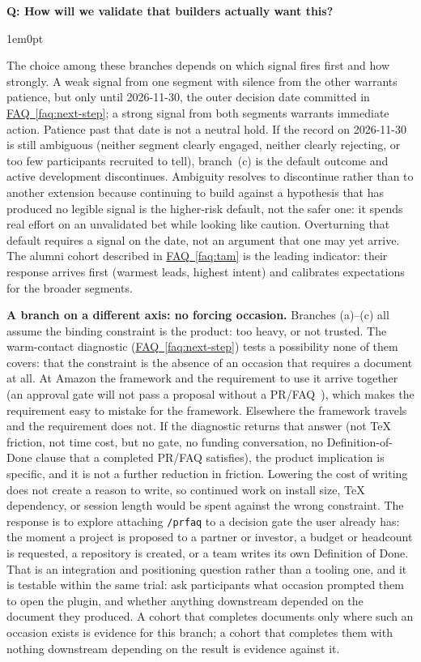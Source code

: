 \documentclass[11pt,letterpaper]{article}
\newcounter{faqnum}
\newenvironment{faqpair}[1]{%
  \needspace{4\baselineskip}%
  \vspace{0.5em}%
  \refstepcounter{faqnum}%
  \noindent\textbf{\color{SectionBlue}Q\thefaqnum: #1}\par\nopagebreak[4]%
  \vspace{0.2em}%
  \begin{adjustwidth}{1em}{0pt}%
  \setlength{\parindent}{0pt}%
}{%
  \end{adjustwidth}%
  \vspace{0.5em}%
}
\newcommand{\faqref}[1]{\hyperref[#1]{FAQ~\ref*{#1}}}
\begin{document}
\begin{faqpair}{How will we validate that builders actually want this?}
  \noindent The choice among these branches depends on which signal fires first and how strongly. A weak signal from one segment with silence from the other warrants patience, but only until 2026-11-30, the outer decision date committed in \faqref{faq:next-step}; a strong signal from both segments warrants immediate action. Patience past that date is not a neutral hold. If the record on 2026-11-30 is still ambiguous (neither segment clearly engaged, neither clearly rejecting, or too few participants recruited to tell), branch~(c) is the default outcome and active development discontinues. Ambiguity resolves to discontinue rather than to another extension because continuing to build against a hypothesis that has produced no legible signal is the higher-risk default, not the safer one: it spends real effort on an unvalidated bet while looking like caution. Overturning that default requires a signal on the date, not an argument that one may yet arrive. The alumni cohort described in \faqref{faq:tam} is the leading indicator: their response arrives first (warmest leads, highest intent) and calibrates expectations for the broader segments.

  \textbf{A branch on a different axis: no forcing occasion.} Branches (a)--(c) all assume the binding constraint is the product: too heavy, or not trusted. The warm-contact diagnostic (\faqref{faq:next-step}) tests a possibility none of them covers: that the constraint is the absence of an occasion that requires a document at all. At Amazon the framework and the requirement to use it arrive together (an approval gate will not pass a proposal without a PR/FAQ~\cite{bryar2021workingbackwards}), which makes the requirement easy to mistake for the framework. Elsewhere the framework travels and the requirement does not. If the diagnostic returns that answer (not TeX friction, not time cost, but no gate, no funding conversation, no Definition-of-Done clause that a completed PR/FAQ satisfies), the product implication is specific, and it is not a further reduction in friction. Lowering the cost of writing does not create a reason to write, so continued work on install size, TeX dependency, or session length would be spent against the wrong constraint. The response is to explore attaching \texttt{/prfaq} to a decision gate the user already has: the moment a project is proposed to a partner or investor, a budget or headcount is requested, a repository is created, or a team writes its own Definition of Done. That is an integration and positioning question rather than a tooling one, and it is testable within the same trial: ask participants what occasion prompted them to open the plugin, and whether anything downstream depended on the document they produced. A cohort that completes documents only where such an occasion exists is evidence for this branch; a cohort that completes them with nothing downstream depending on the result is evidence against it.


\end{faqpair}
\end{document}
